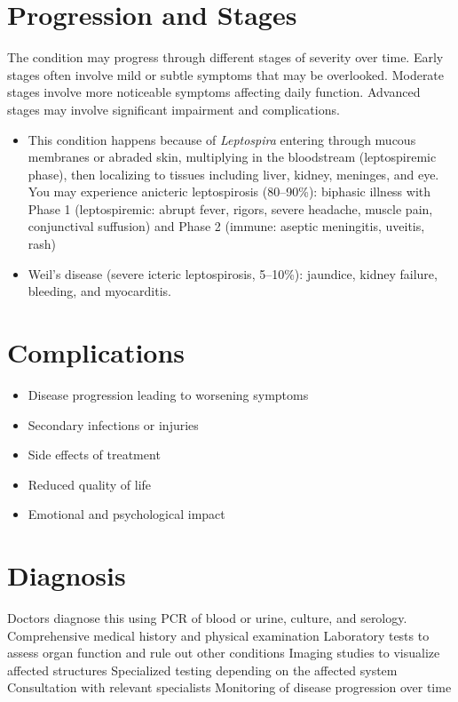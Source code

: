 \section{Progression and Stages}
The condition may progress through different stages of severity over time. Early stages often involve mild or subtle symptoms that may be overlooked. Moderate stages involve more noticeable symptoms affecting daily function. Advanced stages may involve significant impairment and complications.

\begin{itemize}[noitemsep]
  \item This condition happens because of \textit{Leptospira} entering through mucous membranes or abraded skin, multiplying in the bloodstream (leptospiremic phase), then localizing to tissues including liver, kidney, meninges, and eye. You may experience anicteric leptospirosis (80--90\%): biphasic illness with Phase 1 (leptospiremic: abrupt fever, rigors, severe headache, muscle pain, conjunctival suffusion) and Phase 2 (immune: aseptic meningitis, uveitis, rash)
  \item Weil's disease (severe icteric leptospirosis, 5--10\%): jaundice, kidney failure, bleeding, and myocarditis.
\end{itemize}
\section{Complications}
\begin{itemize}[noitemsep]
  \item Disease progression leading to worsening symptoms
  \item Secondary infections or injuries
  \item Side effects of treatment
  \item Reduced quality of life
  \item Emotional and psychological impact
\end{itemize}
\section{Diagnosis}
Doctors diagnose this using PCR of blood or urine, culture, and serology. Comprehensive medical history and physical examination Laboratory tests to assess organ function and rule out other conditions Imaging studies to visualize affected structures Specialized testing depending on the affected system Consultation with relevant specialists Monitoring of disease progression over time


